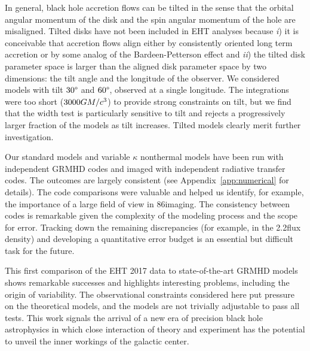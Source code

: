In general, black hole accretion flows can be tilted in the sense that the orbital angular momentum of the disk and the spin angular momentum of the hole are misaligned.  Tilted disks have not been included in EHT analyses because \emph{i}) it is conceivable that accretion flows align either by consistently oriented long term accretion or by some analog of the Bardeen-Petterson effect \citep{1975ApJ...195L..65B} and \emph{ii}) the tilted disk parameter space is larger than the aligned disk parameter space by two dimensions: the tilt angle and the longitude of the observer.  We considered models with tilt $30\degree$ and $60\degree$, observed at a single longitude.  The integrations were too short ($3000GM/c^3$) to provide strong constraints on tilt, but we find that the \mring width test is particularly sensitive to tilt and rejects a progressively larger fraction of the models as tilt increases.  Tilted models clearly merit further investigation.

Our standard models and variable $\kappa$ nonthermal models have been run with independent GRMHD codes and imaged with independent radiative transfer codes.  The outcomes are largely consistent (see Appendix~\ref{app:numerical} for details).  The code comparisons were valuable and helped us identify, for example, the importance of a large field of view in 86\GHz imaging.  The consistency between codes is remarkable given the complexity of the modeling process and the scope for error.  Tracking down the remaining discrepancies (for example, in the 2.2\um flux density) and developing a quantitative error budget is an essential but difficult task for the future.

This first comparison of the EHT 2017 \sgra data to state-of-the-art GRMHD models shows remarkable successes and highlights interesting problems, including the origin of variability.  The observational constraints considered here put pressure on the theoretical models, and the models are not trivially adjustable to pass all tests.  This work signals the arrival of a new era of precision black hole astrophysics in which close interaction of theory and experiment has the potential to unveil the inner workings of the galactic center.

